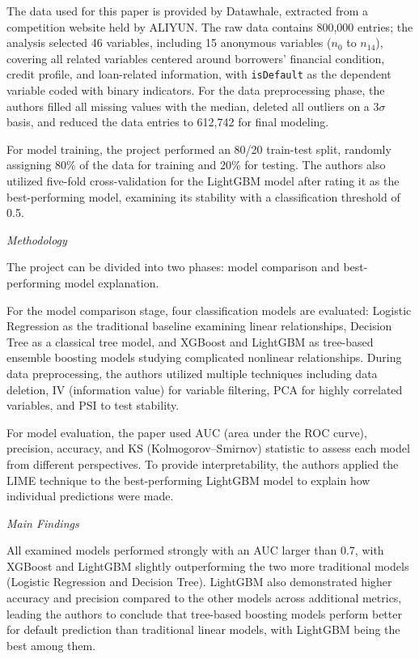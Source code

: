 \documentclass[letterpaper]{article}
\begin{document}
	The data used for this paper is provided by Datawhale, extracted from a competition website held by ALIYUN. The raw data contains 800,000 entries; the analysis selected 46 variables, including 15 anonymous variables ($n_0$ to $n_{14}$), covering all related variables centered around borrowers' financial condition, credit profile, and loan-related information, with \texttt{isDefault} as the dependent variable coded with binary indicators. For the data preprocessing phase, the authors filled all missing values with the median, deleted all outliers on a $3\sigma$ basis, and reduced the data entries to 612,742 for final modeling.
	
	For model training, the project performed an 80/20 train-test split, randomly assigning 80\% of the data for training and 20\% for testing. The authors also utilized five-fold cross-validation for the LightGBM model after rating it as the best-performing model, examining its stability with a classification threshold of 0.5.
	
	\medskip
	
	\textit{Methodology}
	
	The project can be divided into two phases: model comparison and best-performing model explanation.
	
	For the model comparison stage, four classification models are evaluated: Logistic Regression as the traditional baseline examining linear relationships, Decision Tree as a classical tree model, and XGBoost and LightGBM as tree-based ensemble boosting models studying complicated nonlinear relationships. During data preprocessing, the authors utilized multiple techniques including data deletion, IV (information value) for variable filtering, PCA for highly correlated variables, and PSI to test stability.
	
	For model evaluation, the paper used AUC (area under the ROC curve), precision, accuracy, and KS (Kolmogorov--Smirnov) statistic to assess each model from different perspectives. To provide interpretability, the authors applied the LIME technique to the best-performing LightGBM model to explain how individual predictions were made.
	
	\medskip
	
	\textit{Main Findings}
	
	All examined models performed strongly with an AUC larger than 0.7, with XGBoost and LightGBM slightly outperforming the two more traditional models (Logistic Regression and Decision Tree). LightGBM also demonstrated higher accuracy and precision compared to the other models across additional metrics, leading the authors to conclude that tree-based boosting models perform better for default prediction than traditional linear models, with LightGBM being the best among them.
	
\end{document}
